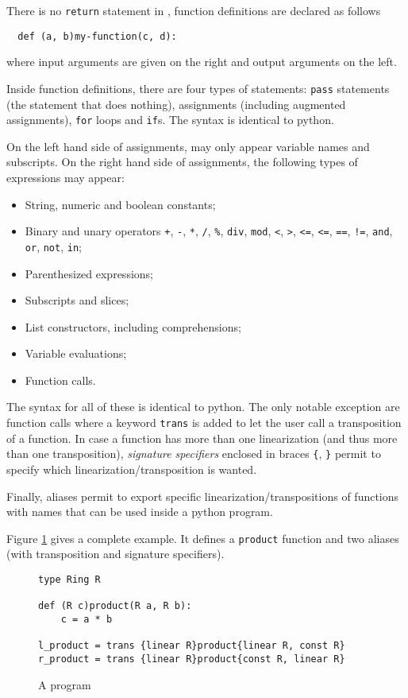 There is no \lstinline+return+ statement in \tALpy{}, function
definitions are declared as follows
\begin{lstlisting}
  def (a, b)my-function(c, d):
\end{lstlisting}
where input arguments are given on the right and output arguments on
the left.

Inside function definitions, there are four types of statements:
\lstinline+pass+ statements (the statement that does nothing),
assignments (including augmented assignments), \lstinline+for+ loops
and \lstinline+if+s. The syntax is identical to python.

On the left hand side of assignments, may only appear variable names
and subscripts. On the right hand side of assignments, the following
types of expressions may appear:
\begin{itemize}
\item String, numeric and boolean constants;
\item Binary and unary operators \lstinline-+-, \lstinline+-+,
  \lstinline+*+, \lstinline+/+,
  \lstinline+%+, \lstinline+div+, \lstinline+mod+, \lstinline+<+,
  \lstinline+>+, \lstinline+<=+, \lstinline+<=+, \lstinline+==+,
  \lstinline+!=+, \lstinline+and+, \lstinline+or+, \lstinline+not+,
  \lstinline+in+;
\item Parenthesized expressions;
\item Subscripts and slices;
\item List constructors, including comprehensions;
\item Variable evaluations;
\item Function calls.
\end{itemize}
The syntax for all of these is identical to python. The only notable
exception are function calls where a keyword \lstinline+trans+ is
added to let the user call a transposition of a function. In case a
function has more than one linearization (and thus more than one
transposition), \emph{signature specifiers} enclosed in braces
\lstinline+{+, \lstinline+}+ permit to specify which
linearization/transposition is wanted.

Finally, aliases permit to export specific
linearization/transpositions of functions with names that can be used
inside a python program.

Figure \ref{fig:prog} gives a complete \tALpy{} example. It defines a
\lstinline+product+ function and two aliases (with transposition and
signature specifiers).

\begin{figure}[!h]
  \centering
\begin{lstlisting}[frame=single,frameround=tttt]
type Ring R

def (R c)product(R a, R b):
    c = a * b
  
l_product = trans {linear R}product{linear R, const R}
r_product = trans {linear R}product{const R, linear R}
\end{lstlisting}
  
  \caption{A \tALpy{} program}
  \label{fig:prog}
\end{figure}



